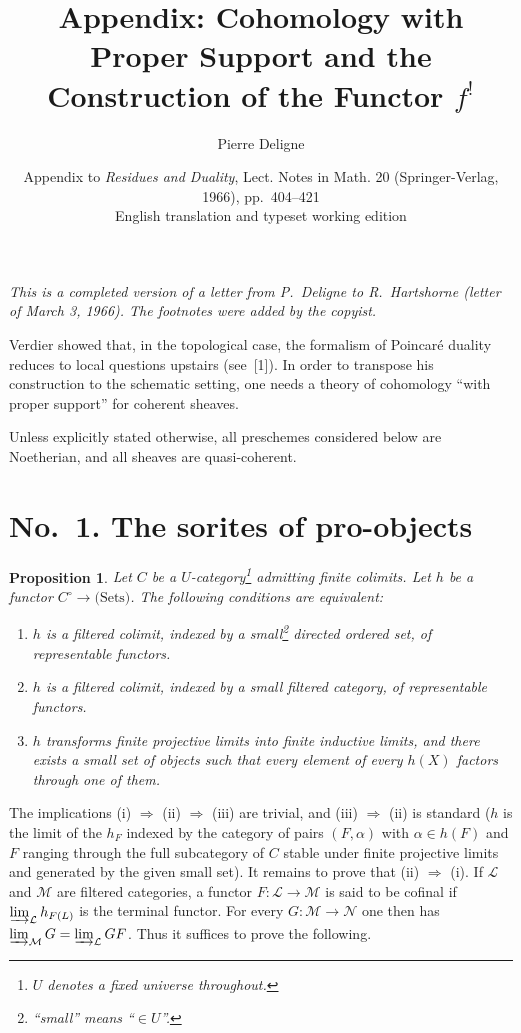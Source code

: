 \documentclass[11pt]{amsart}
\title[Cohomology with proper support]{Appendix: Cohomology with Proper Support and the Construction of the Functor $f^{!}$}
\author{Pierre Deligne}
\date{Appendix to \emph{Residues and Duality}, Lect. Notes in Math. 20 (Springer-Verlag, 1966), pp.~404--421\\English translation and typeset working edition}
\newcommand{\cL}{\mathcal{L}}
\newcommand{\cM}{\mathcal{M}}
\newcommand{\cN}{\mathcal{N}}
\theoremstyle{plain}
\newtheorem{prop}{Proposition}
\theoremstyle{definition}
\begin{document}
\maketitle

\begin{center}
\emph{This is a completed version of a letter from P.~Deligne to R.~Hartshorne (letter of March 3, 1966). The footnotes were added by the copyist.}
\end{center}

\bigskip

Verdier showed that, in the topological case, the formalism of Poincar\'e duality reduces to local questions upstairs (see~[1]). In order to transpose his construction to the schematic setting, one needs a theory of cohomology ``with proper support'' for coherent sheaves.

Unless explicitly stated otherwise, all preschemes considered below are Noetherian, and all sheaves are quasi-coherent.

\section*{No.~1. The sorites of pro-objects}

\begin{prop}
Let $C$ be a $U$-category\footnote{$U$ denotes a fixed universe throughout.} admitting finite colimits. Let $h$ be a functor $C^{\circ} \to \text{(Sets)}$. The following conditions are equivalent:
\begin{enumerate}
\item[(i)] $h$ is a filtered colimit, indexed by a small\footnote{``small'' means ``$\in U$''.} directed ordered set, of representable functors.
\item[(ii)] $h$ is a filtered colimit, indexed by a small filtered category, of representable functors.
\item[(iii)] $h$ transforms finite projective limits into finite inductive limits, and there exists a small set of objects such that every element of every $h(X)$ factors through one of them.
\end{enumerate}
\end{prop}

The implications (i) $\Rightarrow$ (ii) $\Rightarrow$ (iii) are trivial, and (iii) $\Rightarrow$ (ii) is standard ($h$ is the limit of the $h_F$ indexed by the category of pairs $(F,\alpha)$ with $\alpha\in h(F)$ and $F$ ranging through the full subcategory of $C$ stable under finite projective limits and generated by the given small set). It remains to prove that (ii) $\Rightarrow$ (i). If $\cL$ and $\cM$ are filtered categories, a functor $F\colon \cL \to \cM$ is said to be cofinal if $\varinjlim_{\cL} h_{F(L)}$ is the terminal functor. For every $G\colon \cM\to\cN$ one then has $\varinjlim_{\cM} G = \varinjlim_{\cL} GF$. Thus it suffices to prove the following.
\end{document}
